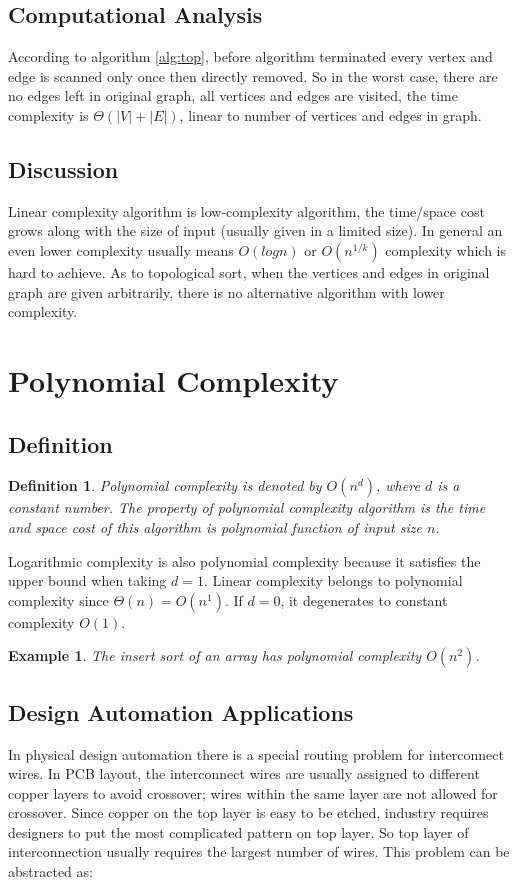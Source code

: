 \documentclass[11pt,twoside, onecolumn]{IEEEtran}
\newtheorem{Definition}{Definition}[section]
\newtheorem{Example}{Example}[section]
\begin{document}
\subsection{Computational Analysis}
According to algorithm \ref{alg:top}, before algorithm terminated every vertex and edge is scanned only once then directly
removed. So in the worst case, there are no edges left in original graph, all vertices and edges are
visited, the time complexity is $\Theta(|V|+|E|)$, linear to number of vertices and edges in graph.

\subsection{Discussion}
Linear complexity algorithm is low-complexity algorithm, the time/space cost grows along with the
size of input (usually given in a limited size). In general an even lower complexity usually means
$O(logn)$ or $O(n^{1/k})$ complexity which is hard to achieve. As to topological sort, when the vertices
and edges in original graph are given arbitrarily, there is no alternative algorithm with lower complexity.

\section{Polynomial Complexity}
\subsection{Definition}
\begin{Definition}
\emph{Polynomial complexity} is denoted by $O(n^d)$, where $d$ is a constant number. The property
of polynomial complexity algorithm is the time and space cost of this algorithm is polynomial function
of input size $n$.
\end{Definition}

Logarithmic complexity is
also polynomial complexity because it satisfies the upper bound when taking $d=1$. Linear complexity belongs
to polynomial complexity since $\Theta(n) = O(n^1)$. If $d=0$, it degenerates to constant complexity $O(1)$.

\begin{Example}
The insert sort of an array has polynomial complexity $O(n^2)$.
\end{Example}

\subsection{Design Automation Applications}
In physical design automation there is a special routing problem for interconnect wires. In PCB layout,
the interconnect wires are usually assigned to different copper layers to avoid crossover; wires within the 
same layer are not allowed for crossover. Since copper on the top layer is easy to be etched, industry
requires designers to put the most complicated pattern on top layer. So top layer of interconnection usually requires
the largest number of wires. This problem can be abstracted as:
\end{document}
